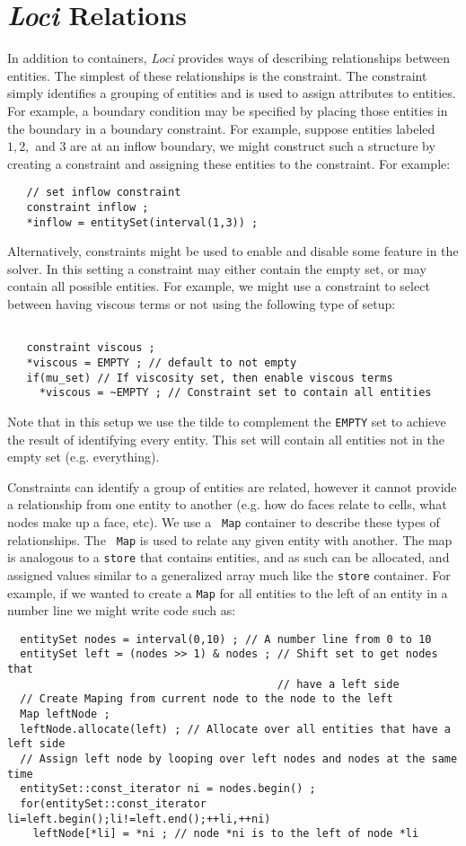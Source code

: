\documentclass[10pt,epsf,letterpaper,twoside]{book}
\begin{document}
\section{{\it Loci} Relations}

In addition to containers, {\it Loci} provides ways of describing
relationships between entities.  The simplest of these relationships
is the constraint.  The constraint simply identifies a grouping of
entities and is used to assign attributes to entities.  For example, a
boundary condition may be specified by placing those entities in the
boundary in a boundary constraint.  For example, suppose entities
labeled $1,2,$ and $3$ are at an inflow boundary, we might construct
such a structure by creating a constraint and assigning these entities
to the constraint.  For example:
\begin{verbatim}
   // set inflow constraint
   constraint inflow ;
   *inflow = entitySet(interval(1,3)) ;
\end{verbatim}
Alternatively, constraints might be used to enable and disable some
feature in the solver.  In this setting a constraint may either
contain the empty set, or may contain all possible entities.  For
example, we might use a constraint to select between having viscous
terms or not using the following type of setup:
\begin{verbatim}

   constraint viscous ;
   *viscous = EMPTY ; // default to not empty 
   if(mu_set) // If viscosity set, then enable viscous terms
     *viscous = ~EMPTY ; // Constraint set to contain all entities
\end{verbatim}
Note that in this setup we use the tilde to complement the {\tt EMPTY} set
to achieve the result of identifying every entity.  This set will contain
all entities not in the empty set (e.g. everything).  

Constraints can identify a group of entities are related, however it
cannot provide a relationship from one entity to another (e.g. how do
faces relate to cells, what nodes make up a face, etc).  We use a {\tt
  Map} container to describe these types of relationships.  The {\tt
  Map} is used to relate any given entity with another.  The map is
analogous to a {\tt store} that contains entities, and as such can be
allocated, and assigned values similar to a generalized array much
like the {\tt store} container.  For example, if we wanted to create a {\tt Map} for all entities to the left of an entity in a number line we might write code such as:
\begin{verbatim}
  entitySet nodes = interval(0,10) ; // A number line from 0 to 10
  entitySet left = (nodes >> 1) & nodes ; // Shift set to get nodes that
                                          // have a left side
  // Create Maping from current node to the node to the left
  Map leftNode ;
  leftNode.allocate(left) ; // Allocate over all entities that have a left side
  // Assign left node by looping over left nodes and nodes at the same time
  entitySet::const_iterator ni = nodes.begin() ;
  for(entitySet::const_iterator li=left.begin();li!=left.end();++li,++ni)
    leftNode[*li] = *ni ; // node *ni is to the left of node *li
\end{verbatim}
\end{document}
